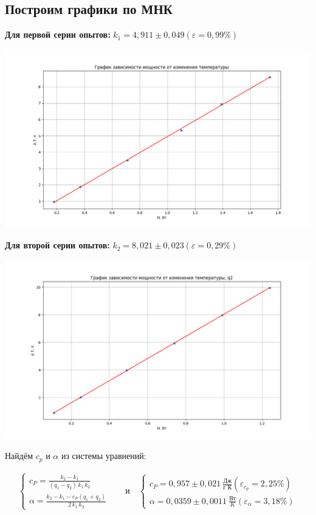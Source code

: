 \documentclass[a4paper,12pt]{article}
\begin{document}
        
        \subsection{Построим графики по МНК}
        \textbf{Для первой серии опытов:}  $k_1 = 4,911 \pm 0,049  (\varepsilon = 0,99 \%)$
        \begin{center}
		\includegraphics[scale=0.6]{q1.png}
	\end{center}
        \textbf{Для второй серии опытов:}  $k_2 = 8,021 \pm 0,023  (\varepsilon = 0,29 \%)$

        \begin{center}
		\includegraphics[scale=0.6]{q2.png}
	\end{center}

        Найдём $c_p$ и $\alpha$ из системы уравнений:

        \[
        \begin{aligned}
            \begin{cases}
                \displaystyle c_P = \frac{k_2 - k_1}{(q_1 - q_2)\, k_1\, k_2} \\[10pt]
                 \displaystyle \alpha = \frac{k_2-k_1-c_P(q_1+q_2)}{2\,k_1\,k_2}
            \end{cases} 
            \quad & \text{и} \quad
            \begin{cases}
                 \displaystyle c_P = 0,957 \pm 0,021\ \frac{\text{Дж}}{\text{г  К}} (\varepsilon_{c_p} = 2,25 \%) \\[10pt]
                 \displaystyle \alpha = 0,0359 \pm 0,0011\ \frac{\text{Вт}}{K} (\varepsilon_{\alpha} = 3,18  \%)
            \end{cases}
        \end{aligned}
        \]
\end{document}
